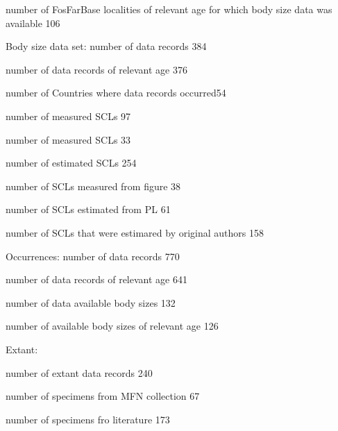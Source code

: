 \documentclass[]{article}
\begin{document}
number of FosFarBase localities of relevant age for which body size data
was available 106

Body size data set: number of data records 384

number of data records of relevant age 376

number of Countries where data records occurred54

number of measured SCLs 97

number of measured SCLs 33

number of estimated SCLs 254

number of SCLs measured from figure 38

number of SCLs estimated from PL 61

number of SCLs that were estimared by original authors 158

Occurrences: number of data records 770

number of data records of relevant age 641

number of data available body sizes 132

number of available body sizes of relevant age 126

Extant:

number of extant data records 240

number of specimens from MFN collection 67

number of specimens fro literature 173
\end{document}
